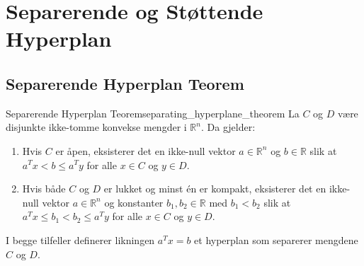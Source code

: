 \section{Separerende og Støttende Hyperplan}

\subsection{Separerende Hyperplan Teorem}
\begin{theorem}{Separerende Hyperplan Teorem}{separating_hyperplane_theorem}
	La \( C \) og \( D \) være disjunkte ikke-tomme konvekse mengder i \( \mathbb{R}^n \). Da gjelder:
	\begin{enumerate}
		\item Hvis \( C \) er åpen, eksisterer det en ikke-null vektor \( a \in \mathbb{R}^n \) og \( b \in \mathbb{R} \) slik at \( a^T x < b \leq a^T y \) for alle \( x \in C \) og \( y \in D \).
		\item Hvis både \( C \) og \( D \) er lukket og minst én er kompakt, eksisterer det en ikke-null vektor \( a \in \mathbb{R}^n \) og konstanter \( b_1, b_2 \in \mathbb{R} \) med \( b_1 < b_2 \) slik at \( a^T x \leq b_1 < b_2 \leq a^T y \) for alle \( x \in C \) og \( y \in D \).
	\end{enumerate}
	I begge tilfeller definerer likningen \(a^Tx = b\) et hyperplan som separerer mengdene \(C\) og \(D\).
\end{theorem}

